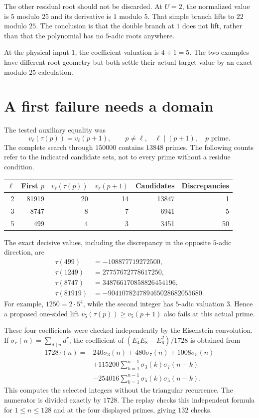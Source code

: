 The other residual root should not be discarded. At $U=2$, the normalized value is $5$ modulo $25$ and its derivative is $1$ modulo $5$. That simple branch lifts to $22$ modulo $25$. The conclusion is that the double branch at $1$ does not lift, rather than that the polynomial has no $5$-adic roots anywhere.

At the physical input $1$, the coefficient valuation is $4+1=5$. The two examples have different root geometry but both settle their actual target value by an exact modulo-$25$ calculation.

\section{A first failure needs a domain}
\label{sec:workbook-valuation-domain}

The tested auxiliary equality was
\[
 v_\ell(\tau(p))=v_\ell(p+1),
 \qquad p\ne\ell,\quad\ell\mid(p+1),\quad p\text{ prime}.
\]
The complete search through $150000$ contains $13848$ primes. The following counts refer to the indicated candidate sets, not to every prime without a residue condition.

\begin{center}
\begingroup\small
\begin{tabular}{r r r r r r}
\toprule
$\ell$ & First $p$ & $v_\ell(\tau(p))$ & $v_\ell(p+1)$ & Candidates & Discrepancies\\
\midrule
2 & 81919 & 20 & 14 & 13847 & 1\\
3 & 8747 & 8 & 7 & 6941 & 5\\
5 & 499 & 4 & 3 & 3451 & 50\\
\bottomrule
\end{tabular}
\endgroup
\end{center}

The exact decisive values, including the discrepancy in the opposite $5$-adic direction, are
\begin{align*}
 \tau(499)&=-108877719272500,\\
 \tau(1249)&=27757672778617250,\\
 \tau(8747)&=348766170858826454196,\\
 \tau(81919)&=-904107824789465028682055680.
\end{align*}
For example, $1250=2\cdot5^4$, while the second integer has $5$-adic valuation $3$. Hence a proposed one-sided lift $v_5(\tau(p))\ge v_5(p+1)$ also fails at this actual prime.

These four coefficients were checked independently by the Eisenstein convolution. If $\sigma_r(n)=\sum_{d\mid n}d^r$, the coefficient of $(E_4E_8-E_6^2)/1728$ is obtained from
\begin{align*}
1728\tau(n)={}&240\sigma_3(n)+480\sigma_7(n)+1008\sigma_5(n)\\
 &+115200\sum_{k=1}^{n-1}\sigma_3(k)\sigma_7(n-k)\\
 &-254016\sum_{k=1}^{n-1}\sigma_5(k)\sigma_5(n-k).
\end{align*}
This computes the selected integers without the triangular recurrence. The numerator is divided exactly by $1728$. The replay checks this independent formula for $1\le n\le128$ and at the four displayed primes, giving $132$ checks.

